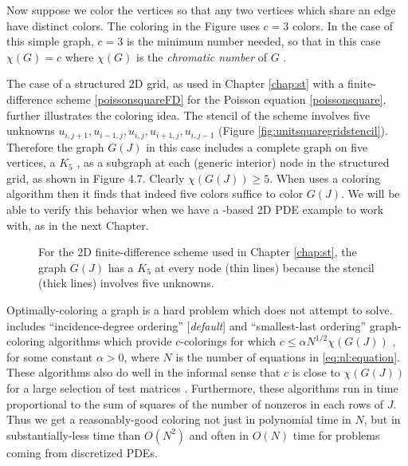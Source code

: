 Now suppose we color the vertices so that any two vertices which share an edge have distinct colors.  The coloring in the Figure uses $c=3$ colors.  In the case of this simple graph, $c=3$ is the minimum number needed, so that in this case $\chi(G)=c$ where $\chi(G)$ is the \emph{chromatic number} of $G$ \citep{ChartrandLesniakZhang2011}.

The case of a structured 2D grid, as used in Chapter \ref{chap:st} with a finite-difference scheme \eqref{poissonsquareFD} for the Poisson equation \eqref{poissonsquare}, further illustrates the coloring idea.  The stencil of the scheme involves five unknowns $u_{i,j+1}, u_{i-1,j}, u_{i,j}, u_{i+1,j}, u_{i,j-1}$ (Figure \ref{fig:unitsquaregridstencil}).  Therefore the graph $G(J)$ in this case includes a complete graph on five vertices, a $K_5$ \citep{ChartrandLesniakZhang2011}, as a subgraph at each (generic interior) node in the structured grid, as shown in Figure 4.7.  Clearly $\chi(G(J))\ge 5$.  When \PETSc uses a coloring algorithm then it finds that indeed five colors suffice to color $G(J)$.  We will be able to verify this behavior when we have a \pSNES-based 2D PDE example to work with, as in the next Chapter.

\begin{figure}

\caption{For the 2D finite-difference scheme used in Chapter \ref{chap:st}, the graph $G(J)$ has a $K_5$ at every node (thin lines) because the stencil (thick lines) involves five unknowns.}
\label{fig:colorstencilplane}
\end{figure}

Optimally-coloring a graph is a hard problem which \PETSc does not attempt to solve.  \PETSc includes ``incidence-degree ordering'' [\emph{default}] and ``smallest-last ordering'' graph-coloring algorithms which provide $c$-colorings for which $c \le \alpha N^{1/2} \chi(G(J))$ \citep{ColemanMore1983}, for some constant $\alpha>0$, where $N$ is the number of equations in \eqref{eq:nl:equation}.  These algorithms also do well in the informal sense that $c$ is close to $\chi(G(J))$ for a large selection of test matrices \citep{ColemanMore1983}.  Furthermore, these algorithms run in time proportional to the sum of squares of the number of nonzeros in each rows of $J$.  Thus we get a reasonably-good coloring not just in polynomial time in $N$, but in substantially-less time than $O(N^2)$ and often in $O(N)$ time for problems coming from discretized PDEs.

